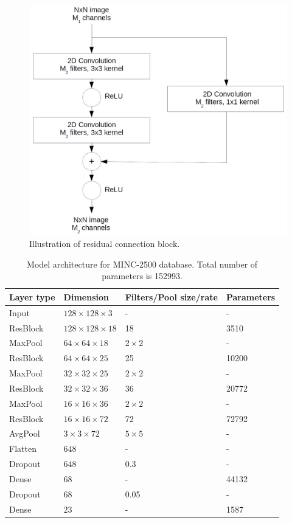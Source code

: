 \documentclass[12pt,a4paper]{article}
\begin{document}
	\begin{figure}
		\centering
		\includegraphics[width=0.7\linewidth]{res_block}
		\caption{Illustration of residual connection block.}
		\label{fig:res_block}
	\end{figure}
	
	\begin{table}[t!]
		\centering
		\caption{Model architecture for MINC-2500 database. Total number of parameters is 152993.}
		\begin{tabular}{l|l l l}
			Layer type  & Dimension & Filters/Pool size/rate & Parameters 	\\ \hline
			Input 		& $128 \times 128 \times 3$  & -  			& -     \\ \hline
			ResBlock 	& $128 \times 128 \times 18$ & 18 			& 3510  \\ \hline
			MaxPool 	& $64 \times 64 \times 18$ & $2 \times 2$	& -     \\ \hline
			ResBlock 	& $64 \times 64 \times 25$ & 25 			& 10200 \\ \hline
			MaxPool 	& $32 \times 32 \times 25$ & $2 \times 2$ 	& -     \\ \hline
			ResBlock 	& $32 \times 32 \times 36$ & 36 			& 20772 \\ \hline
			MaxPool 	& $16 \times 16 \times 36$ & $2 \times 2$ 	& -     \\ \hline
			ResBlock 	& $16 \times 16 \times 72$ & 72 			& 72792 \\ \hline
			AvgPool 	& $3 \times 3 \times 72$   & $5 \times 5$ 	& -	    \\ \hline
			Flatten 	& $648$ 	 			   & -  			& -	    \\ \hline
			Dropout 	& $648$ 	 			   & 0.3  			& -	    \\ \hline
			Dense 		& $68$ 	 			   	   & -  			& 44132 \\ \hline
			Dropout 	& $68$ 	 			   	   & 0.05  			& -	    \\ \hline
			Dense 		& $23$ 	 			   	   & -  			& 1587  \\ \hline
		\end{tabular}
		\label{table:model_minc}
	\end{table}
\end{document}
